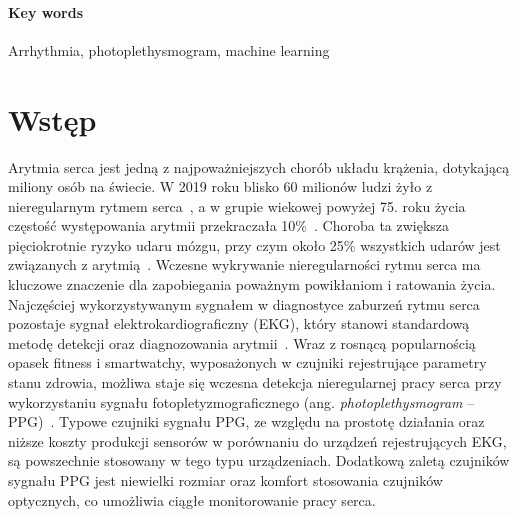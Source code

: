 \documentclass[a4paper,twoside,12pt]{book}
\newcommand{\obcy}[1]{\emph{#1}}
\newcommand{\english}[1]{{\selectlanguage{british}\obcy{#1}}}
\newcounter{stronyPozaNumeracja}
\begin{document}
\subsubsection*{Key words}
\begin{otherlanguage}{british}
	Arrhythmia, photoplethysmogram, machine learning
\end{otherlanguage}




\tableofcontents

\setcounter{stronyPozaNumeracja}{\value{page}}
\mainmatter
\pagestyle{empty}

\cleardoublepage

\pagestyle{NumeryStronNazwyRozdzialow}



\chapter{Wstęp}

Arytmia serca jest jedną z najpoważniejszych chorób układu krążenia, dotykającą miliony osób na świecie. W 2019 roku blisko 60 milionów ludzi żyło z nieregularnym rytmem serca~\cite{Li20232}, a w grupie wiekowej powyżej 75. roku życia częstość występowania arytmii przekraczała 10\%~\cite{Volgman2022}. Choroba ta zwiększa pięciokrotnie ryzyko udaru mózgu, przy czym około 25\% wszystkich udarów jest związanych z arytmią~\cite{Hindricks2021}. Wczesne wykrywanie nieregularności rytmu serca ma kluczowe znaczenie dla zapobiegania poważnym powikłaniom i ratowania życia.\\


Najczęściej wykorzystywanym sygnałem w diagnostyce zaburzeń rytmu serca pozostaje sygnał elektrokardiograficzny (EKG), który stanowi standardową metodę detekcji oraz diagnozowania arytmii~\cite{AYYUB2025110594}. Wraz z rosnącą popularnością opasek fitness i smartwatchy, wyposażonych w czujniki rejestrujące parametry stanu zdrowia, możliwa staje się wczesna detekcja nieregularnej pracy serca przy wykorzystaniu sygnału fotopletyzmograficznego (ang. \english{photoplethysmogram} -- PPG)~\cite{Lubitz2022, Wessling2021}. Typowe czujniki sygnału PPG, ze względu na prostotę działania oraz niższe koszty produkcji sensorów w porównaniu do urządzeń rejestrujących EKG, są powszechnie stosowany w tego typu urządzeniach. Dodatkową zaletą czujników sygnału PPG jest niewielki rozmiar oraz komfort stosowania czujników optycznych, co umożliwia ciągłe monitorowanie pracy serca.
\end{document}
